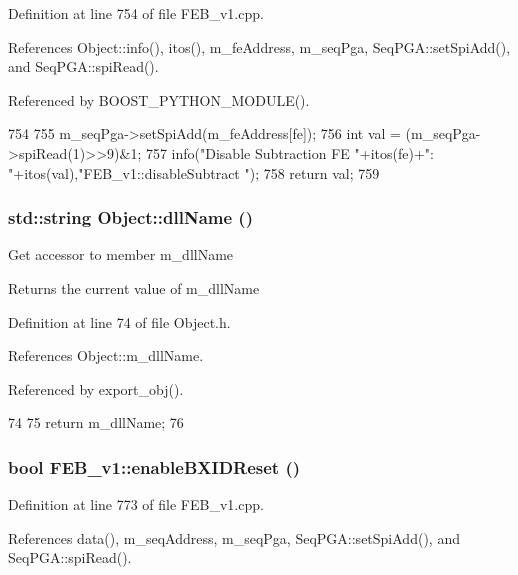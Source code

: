 Definition at line 754 of file FEB\_\-v1.cpp.

References Object::info(), itos(), m\_\-feAddress, m\_\-seqPga, SeqPGA::setSpiAdd(), and SeqPGA::spiRead().

Referenced by BOOST\_\-PYTHON\_\-MODULE().


\begin{DoxyCode}
754                                     {
755   m_seqPga->setSpiAdd(m_feAddress[fe]);
756   int val = (m_seqPga->spiRead(1)>>9)&1;
757   info("Disable Subtraction FE "+itos(fe)+": "+itos(val),"FEB_v1::disableSubtract
      ");
758   return val;
759 }
\end{DoxyCode}
\hypertarget{classObject_a2e3947f2870094c332d7454117f3ec63}{
\subsubsection[{dllName}]{\setlength{\rightskip}{0pt plus 5cm}std::string Object::dllName ()}}
\label{classObject_a2e3947f2870094c332d7454117f3ec63}
Get accessor to member m\_\-dllName \begin{DoxyReturn}{Returns}
the current value of m\_\-dllName 
\end{DoxyReturn}


Definition at line 74 of file Object.h.

References Object::m\_\-dllName.

Referenced by export\_\-obj().


\begin{DoxyCode}
74                        {
75     return m_dllName;
76   }  
\end{DoxyCode}
\hypertarget{classFEB__v1_ac8186be2d5fd8122092d6475e77395e9}{
\subsubsection[{enableBXIDReset}]{\setlength{\rightskip}{0pt plus 5cm}bool FEB\_\-v1::enableBXIDReset ()}}
\label{classFEB__v1_ac8186be2d5fd8122092d6475e77395e9}


Definition at line 773 of file FEB\_\-v1.cpp.

References data(), m\_\-seqAddress, m\_\-seqPga, SeqPGA::setSpiAdd(), and SeqPGA::spiRead().

